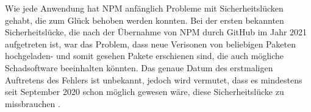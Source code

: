 Wie jede Anwendung hat NPM anfänglich Probleme mit Sicherheitslücken gehabt, die zum Glück behoben werden konnten. Bei der ersten bekannten Sicherheitslücke, die nach der Übernahme von NPM durch GitHub im Jahr 2021 aufgetreten ist, war das Problem, dass neue Verisonen von beliebigen Paketen hochgeladen- und somit gesehen Pakete erschienen sind, die auch mögliche Schadsoftware beeinhalten könnten. Das genaue Datum des erstmaligen Auftretens des Fehlers ist unbekannt, jedoch wird vermutet, dass es mindestens seit September 2020 schon möglich gewesen wäre, diese Sicherheitslücke zu missbrauchen \cite{NPMSecurity}.


